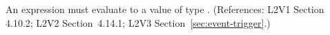 An \Event {} expression must evaluate to a value of type
.  (References: L2V1 Section 4.10.2; L2V2 Section~4.14.1;
L2V3 Section~\ref{sec:event-trigger}.)
